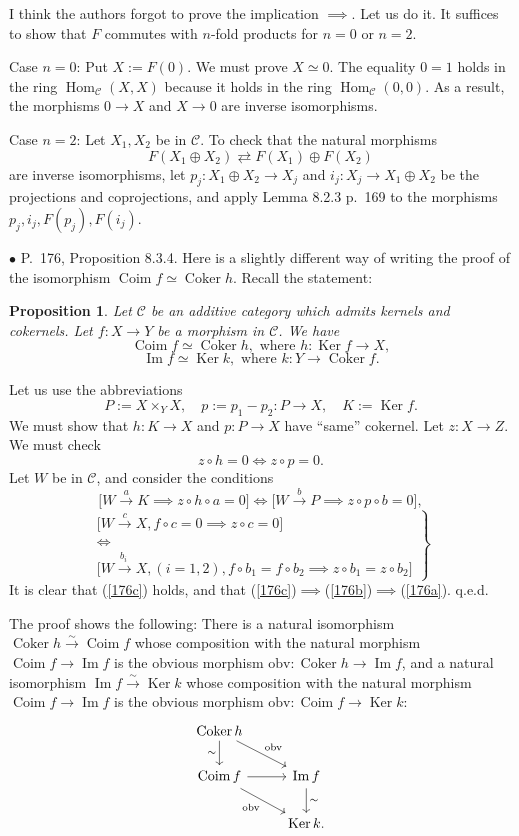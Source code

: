 \documentclass[12pt]{article}
\newtheorem{prop}[thm]{Proposition}
\theoremstyle{remark}%
\newcommand{\bu}{\bullet}
\newcommand{\n}{\noindent}
\newcommand{\C}{\mathcal C}
\newcommand{\pf}{\n{\em Proof. }}
\newcommand{\be}{\begin{equation}}
\newcommand{\ee}{\end{equation}}
\newcommand{\bp}{\begin{prop}}
\newcommand{\ep}{\end{prop}}
\DeclareMathOperator{\Coim}{Coim}
\DeclareMathOperator{\Coker}{Coker}
\DeclareMathOperator{\Ima}{Im}
\DeclareMathOperator{\Hom}{Hom}
\DeclareMathOperator{\Ker}{Ker}
\begin{document}
I think the authors forgot to prove the implication $\implies$. Let us do it. It suffices to show that $F$ commutes with $n$-fold products for $n=0$ or $n=2$. 

Case $n=0$: Put $X:=F(0)$. We must prove $X\simeq 0$. The equality $0=1$ holds in the ring $\Hom_\C(X,X)$ because it holds in the ring $\Hom_\C(0,0)$. As a result, the morphisms $0\to X$ and $X\to 0$ are inverse isomorphisms. 

Case $n=2$: Let $X_1,X_2$ be in $\C$. To check that the natural morphisms 
%
\be\label{173} 
F(X_1\oplus X_2)\rightleftarrows F(X_1)\oplus F(X_2)
\ee 
% 
are inverse isomorphisms, let $p_j:X_1\oplus X_2\to X_j$ and $i_j:X_j\to X_1\oplus X_2$ be the projections and coprojections, and apply Lemma 8.2.3 p.~169 to the morphisms $p_j,i_j,F(p_j),F(i_j)$. 


\n$\bu$ P.~176, Proposition 8.3.4. Here is a slightly different way of writing the proof of the isomorphism $\Coim f\simeq\Coker h$. Recall the statement: 
%
\bp 
Let $\C$ be an additive category which admits kernels and cokernels. Let $f:X\to Y$ be a morphism in $\C$. We have 
$$ 
\Coim f\simeq\Coker h,\text{ where }h:\Ker f\to X, 
$$ 
$$ 
\Ima f\simeq\Ker k,\text{ where }k:Y\to\Coker f.  
$$ 
\ep
% 
\pf Let us use the abbreviations 
$$
P:=X\times_YX,\quad p:=p_1-p_2:P\to X,\quad K:=\Ker f.
$$
We must show that $h:K\to X$ and $p:P\to X$ have ``same'' cokernel. Let $z:X\to Z$. We must check 
%
\begin{equation}\label{176a}
z\circ h=0\iff z\circ p=0.
\end{equation}
%
Let $W$ be in $\C$, and consider the conditions 
%
\begin{equation}\label{176b}
\Big[W\overset{a}{\to}K\implies z\circ h\circ a=0\Big]\iff\Big[W\overset{b}{\to}P\implies z\circ p\circ b=0\Big],
\end{equation}
%
\begin{equation}\label{176c}
\left.
\begin{matrix}
\Big[W\overset{c}{\to}X,f\circ c=0\implies z\circ c=0\Big]\\ 
\iff\\ 
\Big[W\overset{b_i\ }{\to}X,(i=1,2),f\circ b_1=f\circ b_2\implies z\circ b_1=z\circ b_2\Big]
\end{matrix}
\right\}
\end{equation}
It is clear that (\ref{176c}) holds, and that (\ref{176c})$\implies$(\ref{176b})$\implies$(\ref{176a}). q.e.d. 

The proof shows the following: There is a natural isomorphism $\Coker h\xrightarrow{\sim}\Coim f$ whose composition with the natural morphism $\Coim f\to\Ima f$ is the obvious morphism $\text{obv}:\Coker h\to\Ima f$, and a natural isomorphism $\Ima f\xrightarrow{\sim}\Ker k$ whose composition with the natural morphism $\Coim f\to\Ima f$ is the obvious morphism $\text{obv}:\Coim f\to\Ker k$: 
$$
\begin{tikzcd}
\Coker h\ar{d}[swap]{\sim}\ar{dr}{\text{obv}}\\
\Coim f\ar{r}\ar{dr}[swap]{\text{obv}}&\Ima f\ar{d}{\sim}\\
&\Ker k.
\end{tikzcd}
$$
\end{document}
